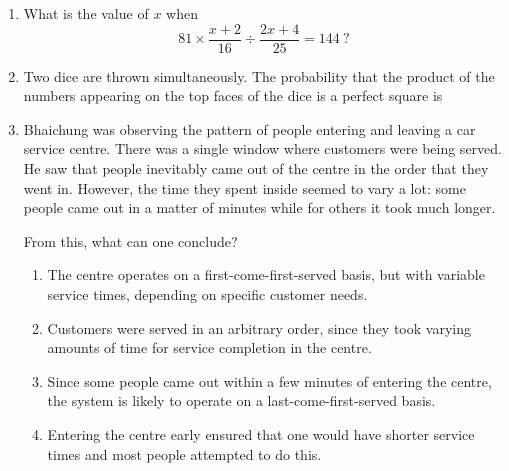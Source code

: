 \documentclass[journal,12pt,onecolumn]{IEEEtran}
\theoremstyle{remark}
\begin{document}
\begin{enumerate}
\item What is the value of $x$ when  
$$81 \times \frac{x+2}{16} \div \frac{2x+4}{25} = 144\ ?$$ \par \hfill{}
\begin{enumerate}
\end{enumerate}

\item Two dice are thrown simultaneously. The probability that the product of the numbers appearing on
the top faces of the dice is a perfect square is \par \hfill{}
\begin{enumerate}
\end{enumerate}

\item Bhaichung was observing the pattern of people entering and leaving a car service centre. There was a single window where customers were being served. He saw that people inevitably came out of the centre in the order that they went in. However, the time they spent inside seemed to vary a lot: some people came out in a matter of minutes while for others it took much longer.

From this, what can one conclude? \par \hfill{}
\begin{enumerate}
    \item The centre operates on a first-come-first-served basis, but with variable service times, depending on specific customer needs.
    \item Customers were served in an arbitrary order, since they took varying amounts of time for service completion in the centre.
    \item Since some people came out within a few minutes of entering the centre, the system is likely to operate on a last-come-first-served basis.
    \item Entering the centre early ensured that one would have shorter service times and most people attempted to do this.
\end{enumerate}


\end{enumerate}
\end{document}
